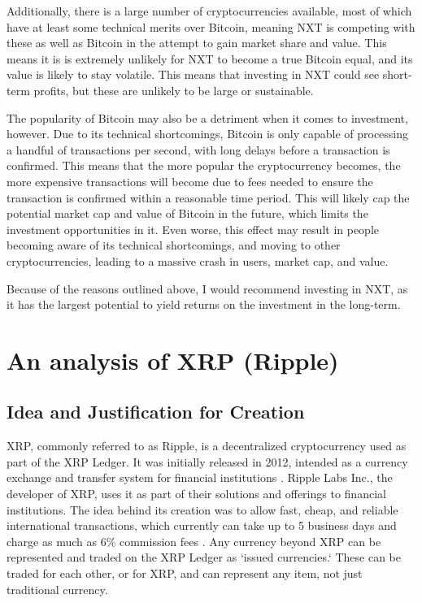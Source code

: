 \documentclass[11pt,a4paper]{article}
\begin{document}
	Additionally, there is a large number of cryptocurrencies available, most of which have at least some technical merits over Bitcoin, meaning NXT is competing with these as well as Bitcoin in the attempt to gain market share and value. This means it is is extremely unlikely for NXT to become a true Bitcoin equal, and its value is likely to stay volatile. This means that investing in NXT could see short-term profits, but these are unlikely to be large or sustainable.
	
	The popularity of Bitcoin may also be a detriment when it comes to investment, however. Due to its technical shortcomings, Bitcoin is only capable of processing a handful of transactions per second, with long delays before a transaction is confirmed. This means that the more popular the cryptocurrency becomes, the more expensive transactions will become due to fees needed to ensure the transaction is confirmed within a reasonable time period. This will likely cap the potential market cap and value of Bitcoin in the future, which limits the investment opportunities in it. Even worse, this effect may result in people becoming aware of its technical shortcomings, and moving to other cryptocurrencies, leading to a massive crash in users, market cap, and value.
	
	Because of the reasons outlined above, I would recommend investing in NXT, as it has the largest potential to yield returns on the investment in the long-term.
	
	\pagebreak
	
	\section{An analysis of XRP (Ripple)}
	
	\subsection{Idea and Justification for Creation}
	
	XRP, commonly referred to as Ripple, is a decentralized cryptocurrency used as part of the XRP Ledger. It was initially released in 2012, intended as a currency exchange and transfer system for financial institutions \cite{finder}. Ripple Labs Inc., the developer of XRP, uses it as part of their solutions and offerings to financial institutions. The idea behind its creation was to allow fast, cheap, and reliable international transactions, which currently can take up to 5 business days and charge as much as 6\% commission fees \cite{topcryptocurrencies}. Any currency beyond XRP can be represented and traded on the XRP Ledger as `issued currencies.` These can be traded for each other, or for XRP, and can represent any item, not just traditional currency.
	
\end{document}
